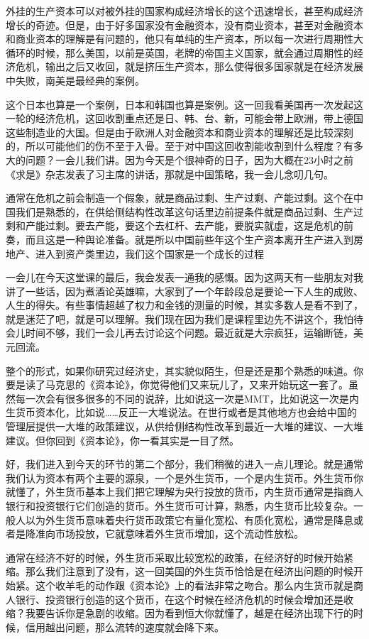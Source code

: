 \documentclass[UTF8, 12pt, a4paper]{ctexrep}
\begin{document}
外挂的生产资本可以对被外挂的国家构成经济增长的这个迅速增长，甚至构成经济增长的奇迹。但是，由于好多国家没有金融资本，没有商业资本，甚至对金融资本和商业资本的理解是有问题的，他只有单纯的生产资本，所以每一次进行周期性大循环的时候，那么美国，以前是英国，老牌的帝国主义国家，就会通过周期性的经济危机，输出之后又收回，就是挤压生产资本，那么使得很多国家就是在经济发展中失败，南美是最经典的案例。

这个日本也算是一个案例，日本和韩国也算是案例。这一回我看美国再一次发起这一轮的经济危机，这回收割重点还是日、韩、台、新，可能会带上欧洲，带上德国这些制造业的大国。但是由于欧洲人对金融资本和商业资本的理解还是比较深刻的，所以可能他们的伤不至于入骨。至于对中国这回收割能收割到什么程度？有多大的问题？一会儿我们讲。因为今天是个很神奇的日子，因为大概在23小时之前《求是》杂志发表了习主席的讲话，那就是中国策略，我一会儿念叨几句。

通常在危机之前会制造一个假象，就是商品过剩、生产过剩、产能过剩。这个在中国我们是熟悉的，在供给侧结构性改革这句话里边前提条件就是商品过剩、生产过剩和产能过剩。要去产能，要这个去杠杆、去产能，要脱实就虚，这是危机的前奏，而且这是一种舆论准备。就是所以中国前些年这个生产资本离开生产进入到房地产、进入到资产类里边，我们这个国家是一个成长的过程

一会儿在今天这堂课的最后，我会发表一通我的感慨。因为这两天有一些朋友对我讲了一些话，因为煮酒论英雄嘛，大家到了一个年龄段总是要论一下人生的成败、人生的得失。有些事情超越了权力和金钱的测量的时候，其实多数人是看不到了，就是迷茫了吧，就是可以理解。我们现在因为我们是课程里边先不讲这个，我怕待会儿时间不够，我们一会儿再去讨论这个问题。最近就是大宗疯狂，运输断链，美元回流。

整个的形式，如果你研究过经济史，其实貌似陌生，但是还是那个熟悉的味道。你要是读了马克思的《资本论》，你觉得他们又来玩儿了，又来开始玩这一套了。虽然每一次会有很多很多的不同的说辞，比如说这一次是MMT，比如说这一次是内生货币资本化，比如说……反正一大堆说法。在世行或者是其他地方也会给中国的管理层提供一大堆的政策建议，从供给侧结构性改革到最近一大堆的建议、一大堆建议。但你回到《资本论》，你一看其实是一目了然。

好，我们进入到今天的环节的第二个部分，我们稍微的进入一点儿理论。就是通常我们认为资本有两个主要的源泉，一个是外生货币，一个是内生货币。外生货币你就懂了，外生货币基本上我们把它理解为央行投放的货币，内生货币通常是指商人银行和投资银行它们创造的货币。外生货币可计算，熟悉，内生货币比较复杂。一般人以为外生货币意味着央行货币政策它有量化宽松、有质化宽松，通常是降息或者是降准向市场投放，它就意味着外生货币增加，这个流动性放松。

通常在经济不好的时候，外生货币采取比较宽松的政策，在经济好的时候开始紧缩。那么我们注意到了没有，这一回美国的外生货币恰恰是在经济出问题的时候开始紧。这个收羊毛的动作跟《资本论》上的看法非常之吻合。那么内生货币就是商人银行、投资银行创造的这个货币，在这个时候在经济危机的时候会增加还是收缩？我要告诉你是急剧的收缩。因为看到恒大你就懂了，越是在经济出现下行的时候，信用越出问题，那么流转的速度就会降下来。
\end{document}
